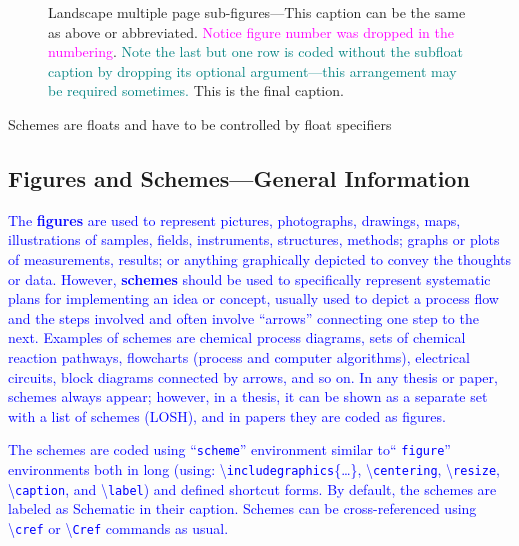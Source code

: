 \documentclass[phd]{ndsu-thesis-2022}
\newcommand\italk[1]{\textcolor{blue}{#1}}  %
\newcommand\cmd[1]{\textbackslash\texttt{#1}}  %
\begin{document}
\begin{landscape}
\begin{figure}[t]
\captionsetup{singlelinecheck=false} %
\caption[]{Landscape multiple page sub-figures---This caption can be the same as above or abbreviated.  \textcolor{magenta}{Notice figure number was dropped in the numbering}. \textcolor{teal}{Note the last but one row is coded without the subfloat caption by dropping its optional argument---this arrangement may be required sometimes.} This is the final caption.} 
\end{figure}

\end{landscape}

{Schemes are floats and have to be controlled by float specifiers}

\subsection{Figures and Schemes---General Information}\label{figs}

\italk{The \textbf{figures} are used to represent pictures, photographs, drawings, maps, illustrations of samples, fields, instruments, structures, methods; graphs or plots of measurements, results; or anything graphically depicted to convey the thoughts or data. However, \textbf{schemes} should be used to specifically represent systematic plans for implementing an idea or concept, usually used to depict a process flow and the steps involved and often involve ``arrows'' connecting one step to the next. Examples of schemes are chemical process diagrams, sets of chemical reaction pathways, flowcharts (process and computer algorithms), electrical circuits, block diagrams connected by arrows, and so on. In any thesis or paper, schemes always appear; however, in a thesis, it can be shown as a separate set with a list of schemes (LOSH), and in papers they are coded as figures.}

\italk{The schemes are coded using ``\texttt{scheme}'' environment similar to`` \texttt{figure}'' environments both in long (using: \cmd{includegraphics}\{\ldots\}, \cmd{centering}, \cmd{resize}, \cmd{caption}, and \cmd{label}) and defined shortcut forms.  By default, the schemes are labeled as Schematic in their caption. Schemes can be cross-referenced using \cmd{cref} or \cmd{Cref} commands as usual.} 
\end{document}
